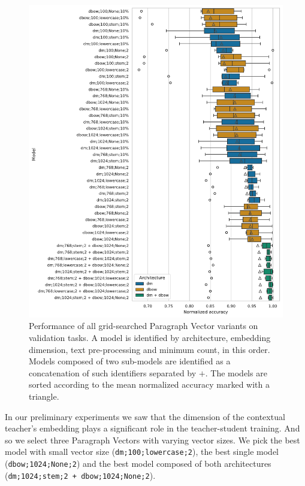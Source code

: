\begin{figure}

    \includegraphics[width=\textwidth]{./img/pv_val_scores.pdf}

    \caption{Performance of all grid-searched Paragraph Vector variants on
    validation tasks. A model is identified by architecture, embedding
    dimension, text pre-processing and minimum count, in this order. Models
    composed of two sub-models are identified as a concatenation of such
    identifiers separated by $+$. The models are sorted according to the mean
    normalized accuracy marked with a triangle.}

    \label{fig:pv_val_scores}

\end{figure}

In our preliminary experiments we saw that the dimension of the contextual
teacher's embedding plays a significant role in the teacher-student training.
And so we select three Paragraph Vectors with varying vector sizes. We pick the
best model with small vector size (\texttt{dm;100;lowercase;2}), the best
single model (\texttt{dbow;1024;None;2}) and the best model composed of both
architectures (\texttt{dm;1024;stem;2 + dbow;1024;None;2}).

